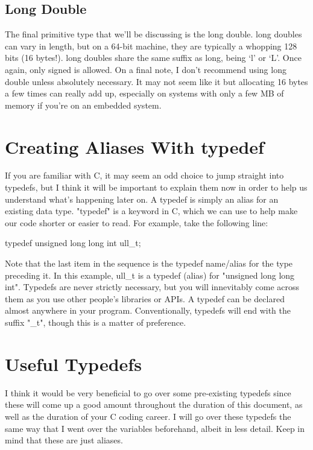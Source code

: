 \documentclass{article}
\begin{document}
\subsection{Long Double}

The final primitive type that we’ll be discussing is the long double. long doubles can vary in length, but on
a 64-bit machine, they are typically a whopping 128 bits (16 bytes!). long doubles share the same suffix as
long, being ‘l’ or ‘L’. Once again, only signed is allowed. On a final note, I don’t recommend using long
double unless absolutely necessary. It may not seem like it but allocating 16 bytes a few times can really add
up, especially on systems with only a few MB of memory if you’re on an embedded system.

\section{Creating Aliases With typedef}

If you are familiar with C, it may seem an odd choice to jump straight into typedefs, but I think it will be
important to explain them now in order to help us understand what’s happening later on. A typedef is simply an
alias for an existing data type. "typedef" is a keyword in C, which we can use to help make our code shorter or
easier to read. For example, take the following line:

\begin{clst}
typedef unsigned long long int ull_t;
\end{clst}

Note that the last item in the sequence is the typedef name/alias for the type preceding it. In this example,
ull\_t is a typedef (alias) for "unsigned long long int". Typedefs are never strictly necessary, but you will
innevitably come across them as you use other people's libraries or APIs. A typedef can be declared almost
anywhere in your program. Conventionally, typedefs will end with the suffix "\_t", though this is a matter of
preference.

\section{Useful Typedefs}

I think it would be very beneficial to go over some pre-existing typedefs since these will come up a good
amount throughout the duration of this document, as well as the duration of your C coding career. I will go
over these typedefs the same way that I went over the variables beforehand, albeit in less detail. Keep in
mind that these are just aliases.
\end{document}
